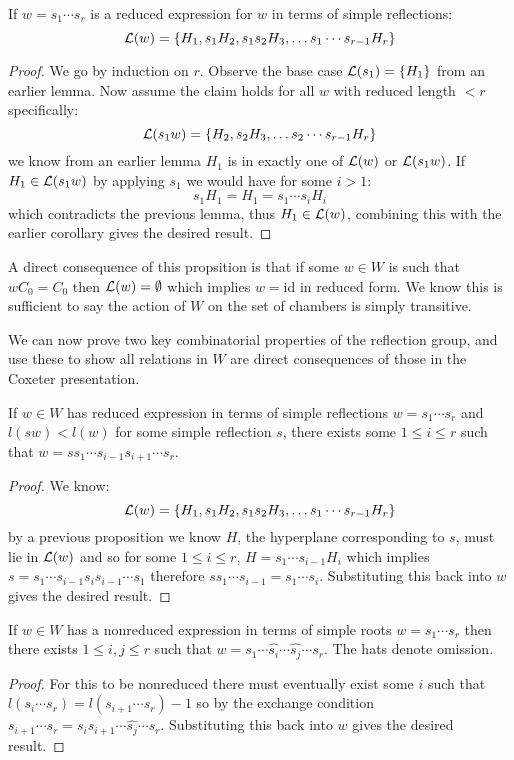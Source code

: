 \documentclass[../main.tex]{subfiles}
\begin{document}
\begin{proposition}
    If $w=s_1\cdots s_r$ is a reduced expression for $w$ in terms of simple reflections: \[
        \mathcal{L}(w) = \{H_1, s_1 H_2, s_1s_2H_3,\ldots s_1\cdots s_{r-1} H_r\}
    \]
    \begin{proof}
        We go by induction on $r$. Observe the base case $\mathcal{L}(s_1) = \{H_1\}$ from an earlier lemma. Now assume the claim holds for all $w$ with reduced length $<r$ specifically:\[
            \mathcal{L}(s_1w) = \{H_2, s_2H_3,\ldots s_2\cdots s_{r-1} H_r\}
        \] we know from an earlier lemma $H_1$ is in exactly one of $\mathcal{L}(w)$ or $\mathcal{L}(s_1w)$. If $H_1\in \mathcal{L}(s_1w)$ by applying $s_1$ we would have for some $i>1$: \[
            s_1H_1 = H_1 = s_1\cdots s_i H_i
        \] which contradicts the previous lemma, thus $H_1\in \mathcal{L}(w)$, combining this with the earlier corollary gives the desired result.
    \end{proof}
\end{proposition}

A direct consequence of this propsition is that if some $w\in W$ is such that $wC_0 = C_0$ then $\mathcal{L}(w)=\emptyset$ which implies $w=\text{id}$ in reduced form. We know this is sufficient to say the action of $W$ on the set of chambers is simply transitive.

We can now prove two key combinatorial properties of the reflection group, and use these to show all relations in $W$ are direct consequences of those in the Coxeter presentation.

\begin{theorem}
    If $w\in W$ has reduced expression in terms of simple reflections $w=s_1\cdots s_r$ and $l(sw)<l(w)$ for some simple reflection $s$, there exists some $1\leq i\leq r$ such that $w = ss_1\cdots s_{i-1}s_{i+1}\cdots s_r$.
    \begin{proof}
        We know:\[
            \mathcal{L}(w) = \{H_1, s_1 H_2, s_1s_2H_3,\ldots s_1\cdots s_{r-1} H_r\}
        \] by a previous proposition we know $H$, the hyperplane corresponding to $s$, must lie in $\mathcal{L}(w)$ and so for some $1\leq i \leq r$, $H=s_1\cdots s_{i-1} H_i$ which implies $s=s_1\cdots s_{i-1} s_i s_{i-1}\cdots s_1$ therefore $ss_1\cdots s_{i-1} = s_1\cdots s_i$. Substituting this back into $w$ gives the desired result.
    \end{proof}
\end{theorem}

\begin{theorem}
    If $w\in W$ has a nonreduced expression in terms of simple roots $w=s_1\cdots s_r$ then there exists $1\leq i,j \leq r$ such that $w=s_1\cdots \hat{s_i}\cdots\hat{s_j}\cdots s_r$. The hats denote omission.
    \begin{proof}
        For this to be nonreduced there must eventually exist some $i$ such that $l(s_i\cdots s_r) = l(s_{i+1}\cdots s_r) -1$ so by the exchange condition $s_{i+1}\cdots s_r = s_i s_{i+1} \cdots \hat{s_j} \cdots s_r$. Substituting this back into $w$ gives the desired result.
    \end{proof}
\end{theorem}
\end{document}
